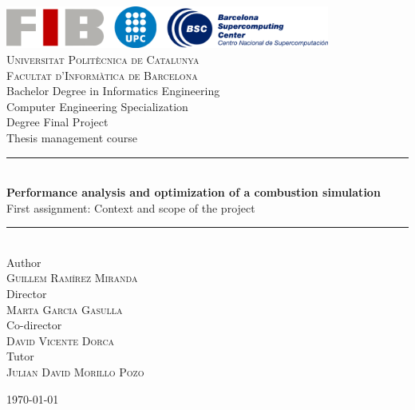 \begin{titlepage}

  \newcommand{\HRule}{\rule{\linewidth}{0.5mm}}

  \begin{center}
    
    \includegraphics[width=0.8\textwidth]{header_logos.png}\\[0.7cm]

    \textsc{\Large Universitat Politècnica de Catalunya}\\[0.1cm]
    \textsc{\large Facultat d'Informàtica de Barcelona}\\[0.4cm]
    {\large Bachelor Degree in Informatics Engineering}\\[0.1cm]
    {\large Computer Engineering Specialization}\\[0.1cm]
    {\large Degree Final Project}\\[0.1cm]
    {\large Thesis management course}\\[1cm]

    \HRule\\[0.4cm]

    {
      \LARGE\bfseries Performance analysis and optimization of a combustion simulation\\[0.2cm]
    }
    {\large First assignment: Context and scope of the project}
    \\[0.4cm]\HRule\\[1cm]

    {\large Author}\\[0.1cm]
    \textsc{\large Guillem Ramírez Miranda}\\[0.4cm]
    {\large Director}\\[0.1cm]
    \textsc{\large Marta Garcia Gasulla}\\[0.4cm]
    {\large Co-director}\\[0.1cm]
    \textsc{\large David Vicente Dorca}\\[0.4cm]
    {\large Tutor}\\[0.1cm]
    \textsc{\large Julian David Morillo Pozo}\\[0.1cm]
    \vfill
    {\large \today\par}

  \end{center}

\end{titlepage}
